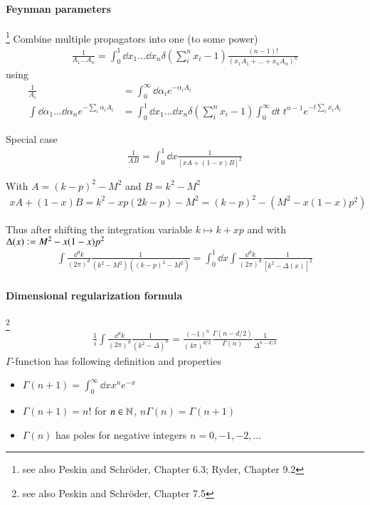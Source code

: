 \paragraph{Feynman parameters}\footnote{see also Peskin and Schröder, Chapter 6.3; Ryder, Chapter 9.2} Combine multiple propagators into one (to some power)
\begin{align}
	\frac{1}{A_1 \dots A_n} = \int^1_0 \dd x_1 \dots \dd x_n \delta \left(\sum_i^n x_i - 1 \right) \frac{(n-1)!}{(x_1 A_1 + \dots + x_n A_n)^n}
\end{align}
using 
\begin{align*}
	\frac{1}{A_i} &= \int^\infty_0 \dd \alpha_i e^{-\alpha_i A_i} \\
	\int \dd \alpha_1 \dots \dd \alpha_n e^{-\sum_i \alpha_i A_i} &= \int^1_0 \dd x_1 \dots \dd x_n \delta \left(\sum^n_i x_i - 1\right) \int^\infty_0 \dd t\; t^{n-1} e^{-t\sum_i x_i A_i}
\end{align*}

Special case
\begin{align}
	\frac{1}{AB} = \int^1_0 \dd x \frac{1}{ \left[ xA + (1-x)B \right]^2  }
\end{align}

With $A = (k-p)^2 - M^2$ and $B=k^2-M^2$
 \begin{align*}
	xA+(1-x)B = k^2 - xp(2k-p) - M^2 = (k-p)^2 - (M^2 -x(1-x)p^2)
\end{align*}

Thus after shifting the integration variable $k \longmapsto k+xp$ and with $\Delta(x) \vcentcolon = M^2 - x(1-x)p^2$
\begin{align*}
	\int \frac{\dd^d k}{(2\pi)^d} \frac{1}{(k^2-M^2)((k-p)^2-M^2)} = \int^1_0 \dd x \int \frac{\dd^d k}{(2\pi)^d} \frac{1}{[k^2 - \Delta(x)]^2}
\end{align*}

\paragraph{Dimensional regularization formula}\footnote{see also Peskin and Schröder, Chapter 7.5}
\begin{align}
	\frac{1}{i} \int \frac{\dd^d k}{(2\pi)^d} \frac{1}{(k^2 - \Delta)^n} = \frac{(-1)^n}{(4\pi)^{d/2}} \frac{\Gamma(n-d/2)}{\Gamma(n)} \frac{1}{\Delta^{n-d/2}}
\end{align}
$\Gamma$-function has following definition and properties
\begin{itemize}
	\item $\Gamma(n+1) = \int^\infty_0 \dd x x^n e^{-x}$
	\item $\Gamma(n+1) = n!$ for $n \in \mathbb{N}$, $n\Gamma(n) = \Gamma(n+1)$
	\item $\Gamma(n)$ has poles for negative integers $n=0, -1, -2, \dots$
\end{itemize}

